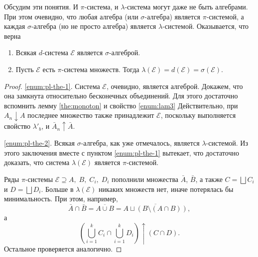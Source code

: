 Обсудим эти понятия. И $ \pi $-система, и $ \lambda $-система могут даже не быть
алгебрами. При этом очевидно, что любая алгебра (или $ \sigma $-алгебра) является $ \pi $-системой, а каждая
$ \sigma $-алгебра (но не просто алгебра) является $ \lambda $-системой.
Оказывается, что верна 

\begin{theorem}\vphantom{I}
  \begin{enumerate}
    \item\label{enum:pl-the-1} Всякая $ d $-система $ \mathscr E $ является $ \sigma $-алгеброй.
    \item\label{enum:pl-the-2} Пусть $ \mathscr E $ есть $ \pi $-система множеств. Тогда $
      \lambda(\mathscr E) = d(\mathscr E) = \sigma(\mathscr E) $.
  \end{enumerate}
  \begin{proof}
    \ref{enum:pl-the-1}. Система $ \mathscr E $, очевидно, является алгеброй. Докажем, что она
     замкнута относительно бесконечных объединений. Для этого достаточно
     вспомнить лемму \ref{the:monoton} и свойство \ref{enum:lam3} Действительно,
     при $ A_n \downarrow A$ последнее множество также принадлежит $ \mathscr E
     $, поскольку выполняется свойство $ \lambda'_b $, и $ \bar A_n
     \uparrow \bar A $.

     \ref{enum:pl-the-2}. Всякая $ \sigma $-алгебра, как уже отмечалось,
     является $ \lambda $-системой. Из этого заключения вместе с пунктом
     \ref{enum:pl-the-1} вытекает, что достаточно доказать, что система $
     \lambda(\mathscr E) $ является $ \pi $-системой.

     Ряды $ \pi $-системы $ \mathscr E \supseteq A,\; B,\; C_i,\; D_i$ пополнили множества $ \bar A
     $, $ \bar B $, а также $ C = \bigsqcup C_i $ и $ D = \bigsqcup D_i $.
     Больше в $ \lambda(\mathscr E) $ никаких множеств нет, иначе потерялась бы
     минимальность. При этом, например,
     \[
       \bar A \cap \bar B = \overline{A \cup B} = \overline{A \sqcup (B
       \setminus (A\cap B))},
     \]
     а  
     \[
       \left(\bigcup_{i=1}^k C_i \cap \bigcup_{i=1}^k D_i\right) \uparrow (C \cap D).
     \]
       Остальное проверяется аналогично.
  \end{proof}
\end{theorem}

